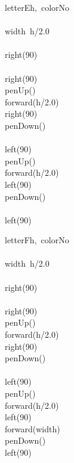 \documentclass[a4paper,10pt]{article}
\begin{document}
\begin{pseudocode}{letterE}{h,\ colorNo }
\label{letterE}
\\
\\
  width\gets\ h/2.0\\
  \\
  right(90)\\
  \\
  right(90)\\
  penUp()\\
  forward(h/2.0)\\
  right(90)\\
  penDown()\\
  \\
  left(90)\\
  penUp()\\
  forward(h/2.0)\\
  left(90)\\
  penDown()\\
  \\
  left(90)\\
\ENDPROCEDURE
\end{pseudocode}


\begin{pseudocode}{letterF}{h,\ colorNo }
\label{letterF}
\\
\\
  width\gets\ h/2.0\\
  \\
  right(90)\\
  \\
  right(90)\\
  penUp()\\
  forward(h/2.0)\\
  right(90)\\
  penDown()\\
  \\
  left(90)\\
  penUp()\\
  forward(h/2.0)\\
  left(90)\\
  forward(width)\\
  penDown()\\
  left(90)\\
\ENDPROCEDURE
\end{pseudocode}
\end{document}
